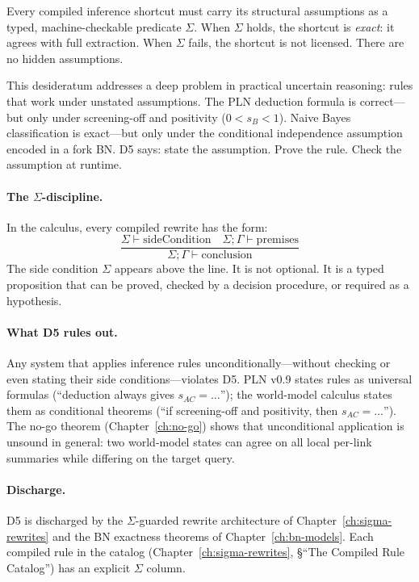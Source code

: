 \begin{definition}
\label{def:d5}
Every compiled inference shortcut must carry its structural
assumptions as a typed, machine-checkable predicate $\Sigma$.  When
$\Sigma$ holds, the shortcut is \emph{exact}: it agrees with full
extraction.  When $\Sigma$ fails, the shortcut is not licensed.
There are no hidden assumptions.
\end{definition}

\noindent
This desideratum addresses a deep problem in practical uncertain
reasoning: rules that work under unstated assumptions.  The PLN
deduction formula is correct---but only under screening-off and
positivity ($0 < s_B < 1$).  Naive Bayes classification is
exact---but only under the conditional independence assumption encoded
in a fork BN.  D5 says: state the assumption.  Prove the rule.  Check
the assumption at runtime.

\paragraph{The $\Sigma$-discipline.}
In the calculus, every compiled rewrite has the form:
\[
  \frac{\Sigma \vdash \mathrm{sideCondition} \quad
        \Sigma; \Gamma \vdash \mathrm{premises}}
       {\Sigma; \Gamma \vdash \mathrm{conclusion}}
\]
The side condition $\Sigma$ appears above the line.  It is not
optional.  It is a typed proposition that can be proved, checked by a
decision procedure, or required as a hypothesis.

\paragraph{What D5 rules out.}
Any system that applies inference rules unconditionally---without
checking or even stating their side conditions---violates D5.  PLN
v0.9 states rules as universal formulas (``deduction always gives
$s_{AC} = \ldots$''); the world-model calculus states them as
conditional theorems (``if screening-off and positivity, then
$s_{AC} = \ldots$'').  The no-go theorem
(Chapter~\ref{ch:no-go}) shows that unconditional application is
unsound in general: two world-model states can agree on all local
per-link summaries while differing on the target query.

\paragraph{Discharge.}
D5 is discharged by the $\Sigma$-guarded rewrite architecture of
Chapter~\ref{ch:sigma-rewrites} and the BN exactness theorems of
Chapter~\ref{ch:bn-models}.  Each compiled rule in the catalog
(Chapter~\ref{ch:sigma-rewrites}, \S``The Compiled Rule Catalog'')
has an explicit $\Sigma$ column.

